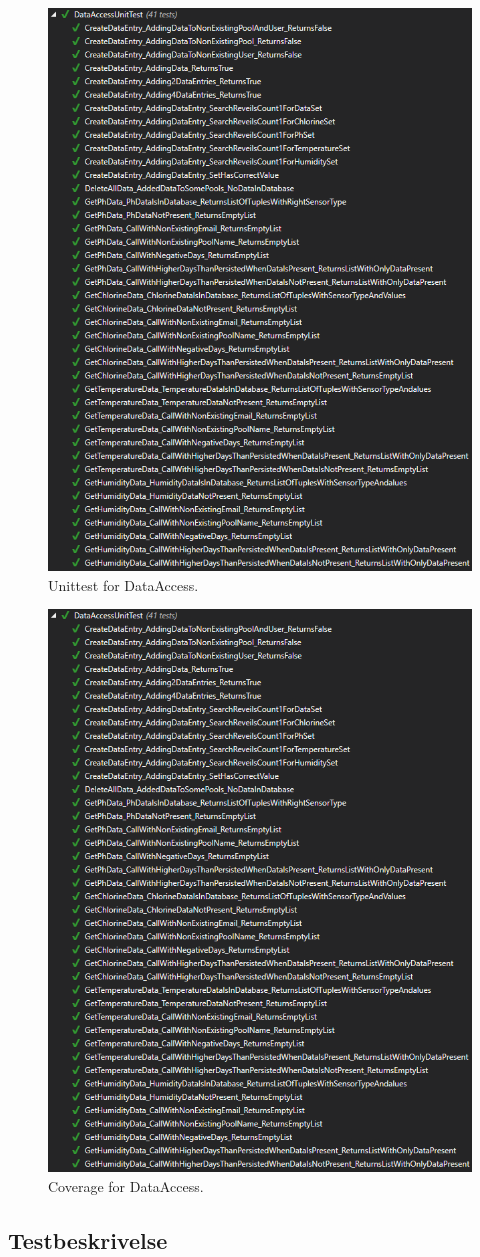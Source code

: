\begin{figure}[h]
	\centering
	\includegraphics[width=0.9\linewidth]{figs/test/dataaccessunittest}
	\caption{Unittest for DataAccess.}
	\label{fig:dataaccessunittest}
\end{figure}

\begin{figure}[h]
	\centering
	\includegraphics[width=0.7\linewidth]{figs/test/dataaccessunittest}
	\caption{Coverage for DataAccess.}
	\label{fig:dataaccessunittest}
\end{figure}

\subsection{Testbeskrivelse}
